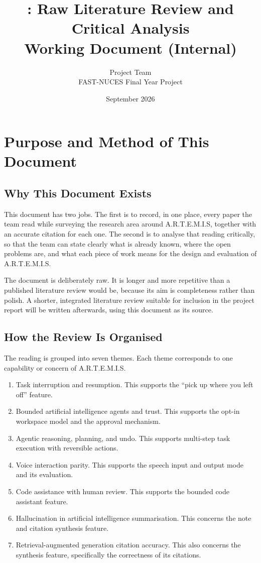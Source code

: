 \documentclass[11pt,a4paper]{report}
\title{\artemis{}: Raw Literature Review and Critical Analysis\\[0.4em]
\large Working Document (Internal)}
\author{\artemis{} Project Team\\FAST-NUCES Final Year Project}
\date{September 2026}
\newcommand{\artemis}{A.R.T.E.M.I.S}
\begin{document}
\maketitle
\tableofcontents

\chapter{Purpose and Method of This Document}

\section{Why This Document Exists}

This document has two jobs. The first is to record, in one place, every
paper the team read while surveying the research area around
\artemis{}, together with an accurate citation for each one. The second
is to analyse that reading critically, so that the team can state
clearly what is already known, where the open problems are, and what
each piece of work means for the design and evaluation of \artemis{}.

The document is deliberately raw. It is longer and more repetitive than
a published literature review would be, because its aim is completeness
rather than polish. A shorter, integrated literature review suitable
for inclusion in the project report will be written afterwards, using
this document as its source.

\section{How the Review Is Organised}

The reading is grouped into seven themes. Each theme corresponds to one
capability or concern of \artemis{}.

\begin{enumerate}
  \item Task interruption and resumption. This supports the
        \enquote{pick up where you left off} feature.
  \item Bounded artificial intelligence agents and trust. This supports
        the opt-in workspace model and the approval mechanism.
  \item Agentic reasoning, planning, and undo. This supports multi-step
        task execution with reversible actions.
  \item Voice interaction parity. This supports the speech input and
        output mode and its evaluation.
  \item Code assistance with human review. This supports the bounded
        code assistant feature.
  \item Hallucination in artificial intelligence summarisation. This
        concerns the note and citation synthesis feature.
  \item Retrieval-augmented generation citation accuracy. This also
        concerns the synthesis feature, specifically the correctness of
        its citations.
\end{enumerate}
\end{document}
